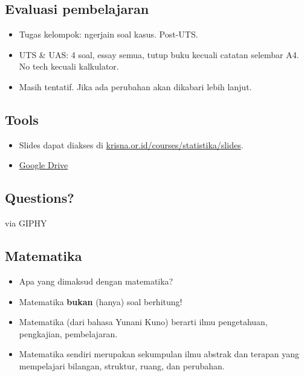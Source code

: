 \documentclass[
  letterpaper,
  DIV=11,
  numbers=noendperiod]{scrartcl}
\begin{document}
\subsection{Evaluasi pembelajaran}\label{evaluasi-pembelajaran-1}

\begin{itemize}
\item
  Tugas kelompok: ngerjain soal kasus. Post-UTS.
\item
  UTS \& UAS: 4 soal, essay semua, tutup buku kecuali catatan selembar
  A4. No tech kecuali kalkulator.
\item
  Masih tentatif. Jika ada perubahan akan dikabari lebih lanjut.
\end{itemize}

\subsection{Tools}\label{tools}

\begin{itemize}
\item
  Slides dapat diakses di
  \href{https://www.krisna.or.id/courses/statistika/slides}{krisna.or.id/courses/statistika/slides}.
\item
  \href{https://drive.google.com/drive/folders/1s8YHrlTFrp-Iu0ip6FesyKahNHLo5had?usp=sharing}{Google
  Drive}
\end{itemize}

\subsection{Questions?}\label{questions}

via GIPHY

\subsection{Matematika}\label{matematika}

\begin{itemize}
\item
  Apa yang dimaksud dengan matematika?
\item
  Matematika \textbf{bukan} (hanya) soal berhitung!
\item
  Matematika (dari bahasa Yunani Kuno) berarti ilmu pengetahuan,
  pengkajian, pembelajaran.
\item
  Matematika sendiri merupakan sekumpulan ilmu abstrak dan terapan yang
  mempelajari bilangan, struktur, ruang, dan perubahan.
\end{itemize}
\end{document}
